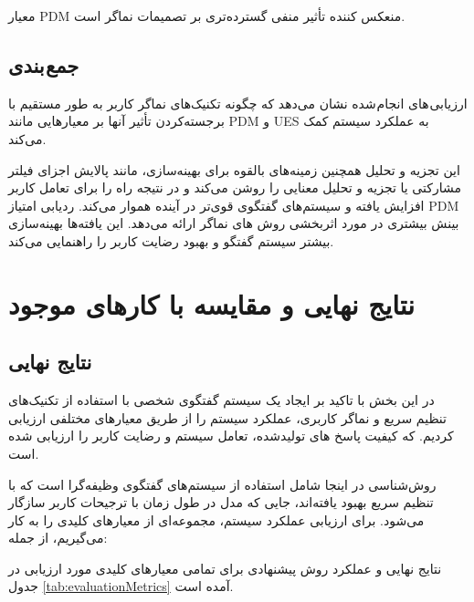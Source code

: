 معیار PDM منعکس کننده تأثیر منفی گسترده‌تری بر تصمیمات نماگر است.




\subsection{جمع بندی}
ارزیابی های انجام شده نشان می‌دهد که چگونه تکنیک‌های نماگر کاربر به طور مستقیم با برجسته‌کردن تأثیر آنها بر معیارهایی مانند PDM و UES به عملکرد سیستم کمک می‌کند. 

این تجزیه و تحلیل همچنین زمینه‌های بالقوه برای بهینه‌سازی، مانند پالایش اجزای فیلتر مشارکتی یا تجزیه و تحلیل معنایی را روشن می‌کند و در نتیجه راه را برای تعامل کاربر افزایش‌ یافته و سیستم‌های گفتگوی قوی‌تر در آینده هموار می‌کند. ردیابی امتیاز PDM بینش بیشتری در مورد اثربخشی روش های نماگر ارائه می‌دهد. این یافته‌ها بهینه‌سازی بیشتر سیستم گفتگو و بهبود رضایت کاربر را راهنمایی می‌کند.

\section{نتایج نهایی و مقایسه با کارهای موجود}

\subsection{نتایج نهایی}
در این بخش با تاکید بر ایجاد یک سیستم گفتگوی شخصی با استفاده از تکنیک‌های تنظیم سریع و نماگر کاربری، عملکرد سیستم را از طریق معیارهای مختلفی ارزیابی کردیم. که کیفیت پاسخ های تولید‌شده، تعامل سیستم و رضایت کاربر را ارزیابی شده است. 

روش‌شناسی در اینجا شامل استفاده از سیستم‌های گفتگوی وظیفه‌گرا است که با تنظیم سریع بهبود یافته‌اند، جایی که مدل در طول زمان با ترجیحات کاربر سازگار می‌شود. برای ارزیابی عملکرد سیستم، مجموعه‌ای از معیارهای کلیدی را به کار می‌گیریم، از جمله:

نتایج نهایی و عملکرد روش پیشنهادی برای تمامی معیارهای کلیدی مورد ارزیابی در جدول%
\ref{tab:evaluationMetrics}
آمده است.

